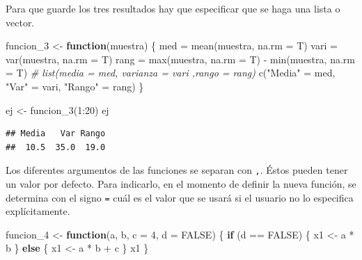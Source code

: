 \documentclass[
]{book}
\newenvironment{Shaded}{\begin{snugshade}}{\end{snugshade}}
\newcommand{\AttributeTok}[1]{\textcolor[rgb]{0.77,0.63,0.00}{#1}}
\newcommand{\CommentTok}[1]{\textcolor[rgb]{0.56,0.35,0.01}{\textit{#1}}}
\newcommand{\ConstantTok}[1]{\textcolor[rgb]{0.00,0.00,0.00}{#1}}
\newcommand{\ControlFlowTok}[1]{\textcolor[rgb]{0.13,0.29,0.53}{\textbf{#1}}}
\newcommand{\DecValTok}[1]{\textcolor[rgb]{0.00,0.00,0.81}{#1}}
\newcommand{\FunctionTok}[1]{\textcolor[rgb]{0.00,0.00,0.00}{#1}}
\newcommand{\NormalTok}[1]{#1}
\newcommand{\OtherTok}[1]{\textcolor[rgb]{0.56,0.35,0.01}{#1}}
\newcommand{\SpecialCharTok}[1]{\textcolor[rgb]{0.00,0.00,0.00}{#1}}
\newcommand{\StringTok}[1]{\textcolor[rgb]{0.31,0.60,0.02}{#1}}
\begin{document}
Para que guarde los tres resultados hay que especificar que se haga una lista o
vector.

\begin{Shaded}
\begin{Highlighting}[]
\NormalTok{funcion\_3 }\OtherTok{\textless{}{-}} \ControlFlowTok{function}\NormalTok{(muestra) \{}
\NormalTok{  med }\OtherTok{=} \FunctionTok{mean}\NormalTok{(muestra, }\AttributeTok{na.rm =}\NormalTok{ T)}
\NormalTok{  vari }\OtherTok{=} \FunctionTok{var}\NormalTok{(muestra, }\AttributeTok{na.rm =}\NormalTok{ T)}
\NormalTok{  rang }\OtherTok{=} \FunctionTok{max}\NormalTok{(muestra, }\AttributeTok{na.rm =}\NormalTok{ T) }\SpecialCharTok{{-}} \FunctionTok{min}\NormalTok{(muestra, }\AttributeTok{na.rm =}\NormalTok{ T)}
  \CommentTok{\# list(media = med, varianza = vari ,rango = rang)}
  \FunctionTok{c}\NormalTok{(}\StringTok{"Media"} \OtherTok{=}\NormalTok{ med,}
    \StringTok{"Var"} \OtherTok{=}\NormalTok{ vari,}
    \StringTok{"Rango"} \OtherTok{=}\NormalTok{ rang)}
\NormalTok{\}}

\NormalTok{ej }\OtherTok{\textless{}{-}} \FunctionTok{funcion\_3}\NormalTok{(}\DecValTok{1}\SpecialCharTok{:}\DecValTok{20}\NormalTok{)}
\NormalTok{ej}
\end{Highlighting}
\end{Shaded}

\begin{verbatim}
## Media   Var Rango 
##  10.5  35.0  19.0
\end{verbatim}

Los diferentes argumentos de las funciones se separan con \texttt{,}. Éstos pueden
tener un valor por defecto. Para indicarlo, en el momento de definir la nueva
función, se determina con el signo \texttt{=} cuál es el valor que se usará si el
usuario no lo especifica explícitamente.

\begin{Shaded}
\begin{Highlighting}[]
\NormalTok{funcion\_4 }\OtherTok{\textless{}{-}} \ControlFlowTok{function}\NormalTok{(a, b, }\AttributeTok{c =} \DecValTok{4}\NormalTok{, }\AttributeTok{d =} \ConstantTok{FALSE}\NormalTok{) \{}
  \ControlFlowTok{if}\NormalTok{ (d }\SpecialCharTok{==} \ConstantTok{FALSE}\NormalTok{) \{}
\NormalTok{    x1 }\OtherTok{\textless{}{-}}\NormalTok{ a }\SpecialCharTok{*}\NormalTok{ b}
\NormalTok{  \} }\ControlFlowTok{else}\NormalTok{ \{}
\NormalTok{    x1 }\OtherTok{\textless{}{-}}\NormalTok{ a }\SpecialCharTok{*}\NormalTok{ b }\SpecialCharTok{+}\NormalTok{ c}
\NormalTok{  \}}
\NormalTok{  x1}
\NormalTok{\}}
\end{Highlighting}
\end{Shaded}
\end{document}
